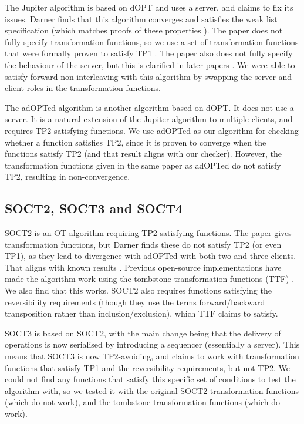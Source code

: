 \documentclass[sigplan,10pt,review,anonymous]{acmart}
\begin{document}
The Jupiter algorithm \cite{Nichols1995} is based on dOPT and uses a server, and claims to fix its issues. Darner finds that this algorithm converges and satisfies the weak list specification (which matches proofs of these properties \cite{Wei2018}). The paper does not fully specify transformation functions, so we use a set of transformation functions that were formally proven to satisfy TP1 \cite{Kleppmann2023}. The paper also does not fully specify the behaviour of the server, but this is clarified in later papers \cite{Xu2014}. We were able to satisfy forward non-interleaving with this algorithm by swapping the server and client roles in the transformation functions.

The adOPTed algorithm \cite{Ressel1996} is another algorithm based on dOPT. It does not use a server. It is a natural extension of the Jupiter algorithm to multiple clients, and requires TP2-satisfying functions. We use adOPTed as our algorithm for checking whether a function satisfies TP2, since it is proven to converge when the functions satisfy TP2 (and that result aligns with our checker). However, the transformation functions given in the same paper as adOPTed do not satisfy TP2, resulting in non-convergence.

\subsection{SOCT2, SOCT3 and SOCT4}

SOCT2 \cite{Suleiman1997} is an OT algorithm requiring TP2-satisfying functions. The paper gives transformation functions, but Darner finds these do not satisfy TP2 (or even TP1), as they lead to divergence with adOPTed with both two and three clients. That aligns with known results \cite{Oster2005Proving}. Previous open-source implementations \cite{Urso2016} have made the algorithm work using the tombstone transformation functions (TTF) \cite{Oster2006TTF}. We also find that this works. SOCT2 also requires functions satisfying the reversibility requirements (though they use the terms forward/backward transposition rather than inclusion/exclusion), which TTF claims to satisfy.


SOCT3 \cite{Vidot2000} is based on SOCT2, with the main change being that the delivery of operations is now serialised by introducing a sequencer (essentially a server). This means that SOCT3 is now TP2-avoiding, and claims to work with transformation functions that satisfy TP1 and the reversibility requirements, but not TP2. We could not find any functions that satisfy this specific set of conditions to test the algorithm with, so we tested it with the original SOCT2 transformation functions (which do not work), and the tombstone
transformation functions (which do work).
\end{document}
